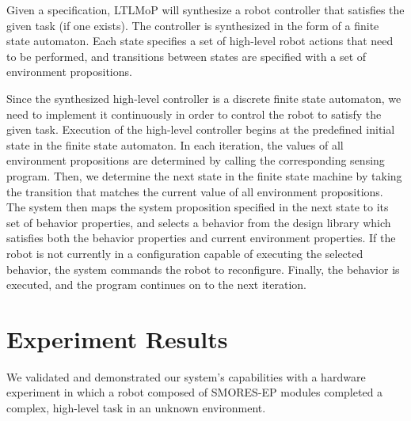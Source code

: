 \documentclass[conference]{IEEEtran}
\newcommand{\lt}{{\tt True }}
\begin{document}
Given a specification,  LTLMoP will synthesize a robot controller that satisfies the given  task (if one exists). The controller is synthesized in the form of a finite state automaton.
Each state specifies a set of high-level robot actions that need to be performed, and transitions between states are specified with a set of environment propositions.


Since the synthesized high-level controller is a discrete finite state automaton, we need to implement it continuously in order to control the robot to satisfy the given task. 
Execution of the high-level controller begins at the predefined initial state in the finite state automaton. In each iteration, the values of all environment propositions  are determined by calling the corresponding sensing program. Then, we determine the next state in the finite state machine by taking the transition that matches the current value of all environment propositions.
The system then maps the system proposition specified in the next state to its set of behavior properties, and selects a behavior from the design library which satisfies both the behavior properties and current environment properties. If the robot is not currently in a configuration capable of executing the selected behavior, the system commands the robot to reconfigure. Finally, the behavior is executed, and the program continues on to the next iteration. 



\section{Experiment Results}
\label{sec:experiments}
%

We validated and demonstrated our system's capabilities with a hardware experiment in which a robot composed of SMORES-EP modules completed a complex, high-level task in an unknown environment.
\end{document}
